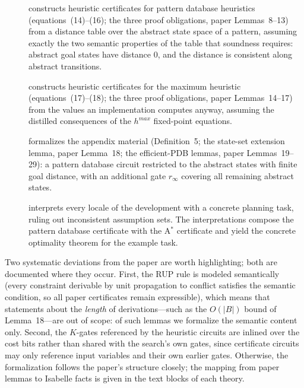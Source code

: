 \documentclass[11pt,a4paper]{article}
\begin{document}
\begin{description}
\item[] constructs heuristic certificates for
pattern database heuristics (equations~(14)--(16); the three proof
obligations, paper Lemmas~8--13) from a
distance table over the abstract state space of a pattern, assuming exactly
the two semantic properties of the table that soundness requires: abstract
goal states have distance $0$, and the distance is consistent along abstract
transitions.

\item[] constructs heuristic certificates for the
maximum heuristic (equations~(17)--(18); the three proof
obligations, paper Lemmas~14--17) from the values an
implementation computes anyway, assuming the distilled consequences of the
$h^{\mathit{max}}$ fixed-point equations.

\item[] formalizes the appendix material
(Definition~5; the state-set extension lemma, paper Lemma~18;
the efficient-PDB lemmas, paper Lemmas~19--29): a pattern database circuit
restricted to the abstract states with finite goal distance, with an
additional gate $r_\infty$ covering all remaining abstract states.

\item[] interprets every locale of the development
with a concrete planning task, ruling out inconsistent assumption sets. The
interpretations compose the pattern database certificate with the A$^*$
certificate and yield the concrete optimality theorem for the example task.
\end{description}

Two systematic deviations from the paper are worth highlighting; both are
documented where they occur. First, the RUP rule is modeled semantically
(every constraint derivable by unit propagation to conflict satisfies the
semantic condition, so all paper certificates remain expressible), which
means that statements about the \emph{length} of derivations---such as the
$O(|B|)$ bound of Lemma~18---are out of scope: of such lemmas we formalize the
semantic content only. Second, the $K$-gates referenced by the heuristic
circuits are inlined over the cost bits rather than shared with the search's
own gates, since certificate circuits may only reference input variables and
their own earlier gates. Otherwise, the formalization follows the paper's structure closely;
the mapping from paper lemmas to Isabelle facts is given in the text blocks of each theory.





\end{document}
